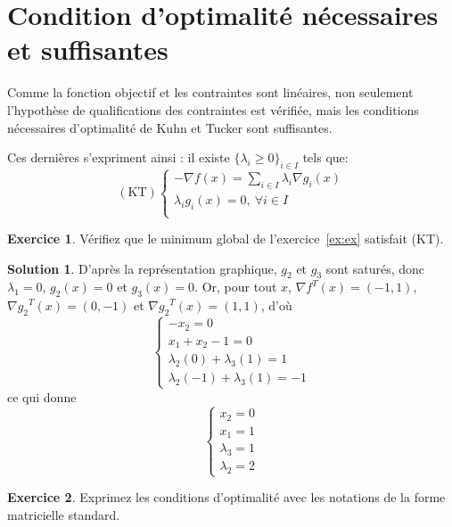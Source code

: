 \documentclass[a4paper,francais]{article}
\theoremstyle{definition}
\newtheorem{exercice}{Exercice}[section]
\newtheorem*{solution}{Solution}
\begin{document}
\section{Condition d'optimalité nécessaires et suffisantes}

Comme la fonction objectif et les contraintes sont linéaires, non seulement
l'hypothèse de qualifications des contraintes est vérifiée, mais les conditions
nécessaires d'optimalité de Kuhn et Tucker sont suffisantes.

Ces dernières s'expriment ainsi : il existe $\{\lambda_i \geq 0\}_{i \in I}$ tels que:
\[
(\text{KT})
\left\{
\begin{array}{l}
  -{\nabla f}(x) = \sum_{i \in I} \lambda_i {\nabla g_i}(x) \\
  \lambda_i g_i(x) = 0, \ \forall i \in I \\
\end{array}
\right.
\]

\begin{exercice}
Vérifiez que le minimum global de l'exercice~\ref{ex:ex} satisfait (KT). 
\end{exercice}

\begin{solution}
  D'après la représentation graphique, $g_2$ et $g_3$ sont saturés, donc
  $\lambda_1 = 0$, $g_2(x) = 0$ et $g_3(x) = 0$. Or, pour tout $x$,
  ${\nabla f}^T(x) = (-1,1)$, ${\nabla g_2}^T(x) = (0,-1)$ et ${\nabla g_2}^T(x) = (1,1)$,
  d'où
\[
\left\{
\begin{array}{l}
  - x_2 = 0 \\
  x_1 + x_2 - 1 = 0 \\
  \lambda_2(0) + \lambda_3 (1) = 1 \\
  \lambda_2(-1) + \lambda_3 (1) = -1 
\end{array}
\right.
\]
ce qui donne
\[
\left\{
\begin{array}{l}
  x_2 = 0 \\
  x_1 = 1 \\
  \lambda_3 = 1 \\
  \lambda_2 = 2 
\end{array}
\right.
\]
\end{solution}

\begin{exercice}
  Exprimez les conditions d'optimalité avec les notations de la forme matricielle standard. 
\end{exercice}
\end{document}
